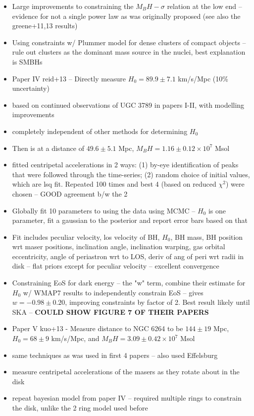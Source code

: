 \begin{itemize}
\item Large improvements to constraining the $M_BH-\sigma$ relation at the low end -- evidence for not a single power law as was originally proposed (see also the greene+11,13 results)
\item Using constraints w/ Plummer model for dense clusters of compact objects -- rule out clusters as the dominant mass source in the nuclei, best explanation is SMBHs
\item Paper IV reid+13 -- Directly measure $H_0=89.9\pm7.1$ km/s/Mpc (10\% uncertainty)
\item based on continued observations of UGC 3789 in papers I-II, with modelling improvements
\item completely independent of other methods for determining $H_0$
\item Then is at a distance of $49.6\pm5.1$ Mpc, $M_BH=1.16\pm0.12\times10^7$ Msol
\item fitted centripetal accelerations in 2 ways: (1) by-eye identification of peaks that were followed through the time-series; (2) random choice of initial values, which are lsq fit. Repeated 100 times and best 4 (based on reduced $\chi^2$) were chosen -- GOOD agreement b/w the 2
\item Globally fit 10 parameters to using the data using MCMC -- $H_0$ is one parameter, fit a gaussian to the posterior and report error bars based on that
\item Fit includes peculiar velocity, los velocity of BH, $H_0$, BH mass, BH position wrt maser positions, inclination angle, inclination warping, gas orbital eccentricity, angle of periastron wrt to LOS, deriv of ang of peri wrt radii in disk -- flat priors except for peculiar velocity -- excellent convergence
\item Constraining EoS for dark energy -- the "w" term, combine their estimate for $H_0$ w/ WMAP7 results to independently constrain EoS -- gives $w=-0.98\pm0.20$, improving constraints by factor of 2. Best result likely until SKA -- \textbf{COULD SHOW FIGURE 7 OF THEIR PAPERS}
\item Paper V kuo+13 - Measure distance to NGC 6264 to be $144\pm19$ Mpc, $H_0=68\pm9$ km/s/Mpc, and $M_BH = 3.09\pm0.42\times 10^7$ Msol
\item same techniques as was used in first 4 papers -- also used Effelsburg
\item measure centripetal accelerations of the masers as they rotate about in the disk
\item repeat bayesian model from paper IV -- required multiple rings to constrain the disk, unlike the 2 ring model used before

\end{itemize}
